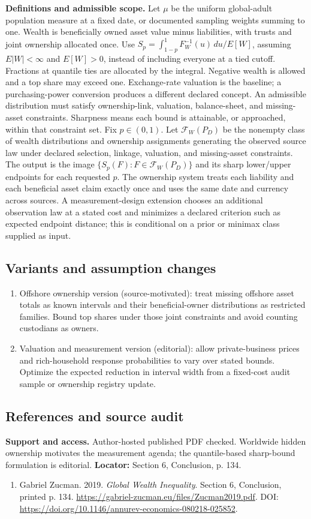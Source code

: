 \documentclass[11pt,a4paper]{article}
\begin{document}
\textbf{Definitions and admissible scope.} Let \(\mu\) be the uniform global-adult population measure at a fixed date, or documented sampling weights summing to one. Wealth is beneficially owned asset value minus liabilities, with trusts and joint ownership allocated once. Use \(S_p=\int_{1-p}^1F_W^{-1}(u)\,du/E[W]\), assuming \(E|W|<\infty\) and \(E[W]>0\), instead of including everyone at a tied cutoff. Fractions at quantile ties are allocated by the integral. Negative wealth is allowed and a top share may exceed one. Exchange-rate valuation is the baseline; a purchasing-power conversion produces a different declared concept. An admissible distribution must satisfy ownership-link, valuation, balance-sheet, and missing-asset constraints. Sharpness means each bound is attainable, or approached, within that constraint set. Fix \(p\in(0,1)\). Let \(\mathcal F_W(P_D)\) be the nonempty class of wealth distributions and ownership assignments generating the observed source law under declared selection, linkage, valuation, and missing-asset constraints. The output is the image \(\{S_p(F):F\in\mathcal F_W(P_D)\}\) and its sharp lower/upper endpoints for each requested \(p\). The ownership system treats each liability and each beneficial asset claim exactly once and uses the same date and currency across sources. A measurement-design extension chooses an additional observation law at a stated cost and minimizes a declared criterion such as expected endpoint distance; this is conditional on a prior or minimax class supplied as input.
\subsection*{Variants and assumption changes}
\begin{enumerate}
\item Offshore ownership version (source-motivated): treat missing offshore asset totals as known intervals and their beneficial-owner distributions as restricted families. Bound top shares under those joint constraints and avoid counting custodians as owners.
\item Valuation and measurement version (editorial): allow private-business prices and rich-household response probabilities to vary over stated bounds. Optimize the expected reduction in interval width from a fixed-cost audit sample or ownership registry update.
\end{enumerate}
\subsection*{References and source audit}
\textbf{Support and access.} Author-hosted published PDF checked. Worldwide hidden ownership motivates the measurement agenda; the quantile-based sharp-bound formulation is editorial. \textbf{Locator:} Section 6, Conclusion, p. 134.
\begin{enumerate}\raggedright
\item\hypertarget{definitions:source:30007643:1}{} Gabriel Zucman. 2019. \emph{Global Wealth Inequality}. Section 6, Conclusion, printed p. 134.
\url{https://gabriel-zucman.eu/files/Zucman2019.pdf}.
DOI: \url{https://doi.org/10.1146/annurev-economics-080218-025852}.
\end{enumerate}
\end{document}
